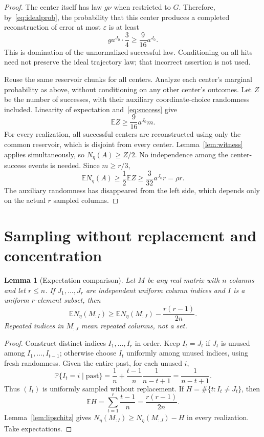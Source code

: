 \documentclass[11pt,a4paper]{article}
\newtheorem{lemma}[theorem]{Lemma}
\theoremstyle{remark}\newtheorem{remark}[theorem]{Remark}
\newcommand{\E}{\mathbb E}
\newcommand{\Prob}{\mathbb P}
\begin{document}
\begin{proof}
The center itself has law $g\nu$ when restricted to $G$. Therefore, by~\eqref{eq:idealprob}, the probability that this center produces a completed reconstruction of error at most $\varepsilon$ is at least
\begin{equation}\label{eq:success}
 g a^{J_0}\cdot\frac34\ge\frac9{16}a^{J_0}.
\end{equation}
This is domination of the unnormalized successful law. Conditioning on all hits need not preserve the ideal trajectory law; that incorrect assertion is not used.

Reuse the same reservoir chunks for all centers. Analyze each center's marginal probability as above, without conditioning on any other center's outcomes. Let $Z$ be the number of successes, with their auxiliary coordinate-choice randomness included. Linearity of expectation and~\eqref{eq:success} give
\[
 \E Z\ge\frac9{16}a^{J_0}m.
\]
For every realization, all successful centers are reconstructed using only the common reservoir, which is disjoint from every center. Lemma~\ref{lem:witness} applies simultaneously, so $N_\eta(A)\ge Z/2$. No independence among the center-success events is needed. Since $m\ge r/3$,
\[
 \E N_\eta(A)\ge\frac12\E Z
 \ge\frac{3}{32}a^{J_0}r=\rho r.
\]
The auxiliary randomness has disappeared from the left side, which depends only on the actual $r$ sampled columns.
\end{proof}

\section{Sampling without replacement and concentration}
\begin{lemma}[Expectation comparison]\label{lem:coupling}
Let $M$ be any real matrix with $n$ columns and let $r\le n$. If $J_1,\ldots,J_r$ are independent uniform column indices and $I$ is a uniform $r$-element subset, then
\begin{equation}\label{eq:coupling}
 \E N_\eta(M_{:I})\ge
 \E N_\eta(M_{:J})-\frac{r(r-1)}{2n}.
\end{equation}
Repeated indices in $M_{:J}$ mean repeated columns, not a set.
\end{lemma}
\begin{proof}
Construct distinct indices $I_1,\ldots,I_r$ in order. Keep $I_t=J_t$ if $J_t$ is unused among $I_1,\ldots,I_{t-1}$; otherwise choose $I_t$ uniformly among unused indices, using fresh randomness. Given the entire past, for each unused $i$,
\[
 \Prob\{I_t=i\mid\text{past}\}
 =\frac1n+\frac{t-1}{n}\frac1{n-t+1}
 =\frac1{n-t+1}.
\]
Thus $(I_t)$ is uniformly sampled without replacement. If $H=\#\{t:I_t\ne J_t\}$, then
\[
 \E H=\sum_{t=1}^r\frac{t-1}{n}=\frac{r(r-1)}{2n}.
\]
Lemma~\ref{lem:lipschitz} gives $N_\eta(M_{:I})\ge N_\eta(M_{:J})-H$ in every realization. Take expectations.
\end{proof}
\end{document}
